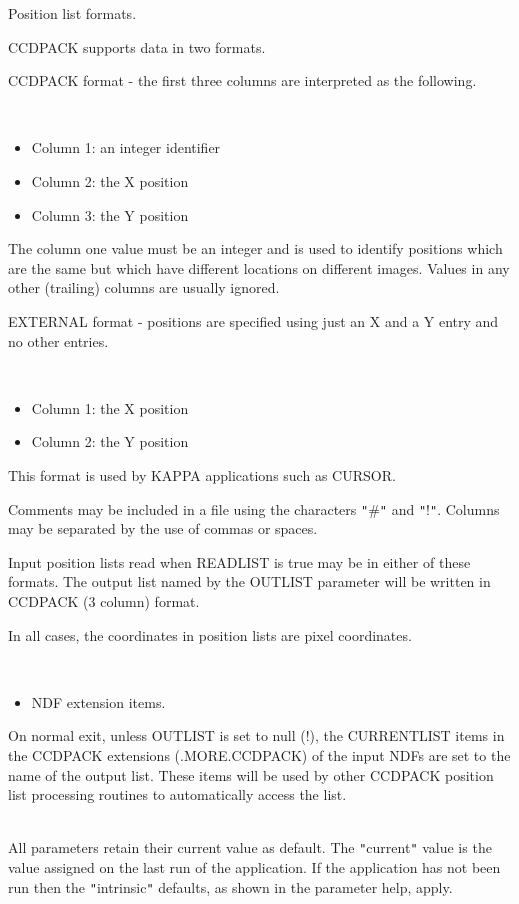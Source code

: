 \documentclass[twoside,11pt]{article}
\newcommand{\xref}[3]{#1}
\renewcommand{\_}{\texttt{\symbol{95}}}
\newcommand{\sstdiytopic}[2]{\item[#1:] \mbox{} \\[1.3ex] #2}
\newcommand{\sstitemlist}[1]{
  \mbox{} \\
  \vspace{-3.5ex}
  \begin{itemize}
     #1
  \end{itemize}
}
\newcommand{\sstitem}{\item}
\newcommand{\sstdiytopic}[2]{\item[{#1:}] #2 }
\newcommand{\sstitemlist}[1]{
      \begin{itemize}
         #1
      \end{itemize}
      \\
   }
\newcommand{\sstitem}{\item}
\begin{document}
{{{         \sstitem
         Position list formats.

      }
        CCDPACK supports data in two formats.

        CCDPACK format - the first three columns are interpreted as the
        following.

      \sstitemlist{

         \sstitem
              Column 1: an integer identifier

         \sstitem
              Column 2: the X position

         \sstitem
              Column 3: the Y position

      }
        The column one value must be an integer and is used to identify
        positions which are the same but which have different locations
        on different images. Values in any other (trailing) columns are
        usually ignored.

        EXTERNAL format - positions are specified using just an X and
        a Y entry and no other entries.

      \sstitemlist{

         \sstitem
              Column 1: the X position

         \sstitem
              Column 2: the Y position

      }
        This format is used by KAPPA applications such as \xref{CURSOR}{sun95}{CURSOR}.

        Comments may be included in a file using the characters {\tt "}\#{\tt "} and
        {\tt "}!{\tt "}. Columns may be separated by the use of commas or spaces.

        Input position lists read when READLIST is true may be in either
        of these formats.  The output list named by the OUTLIST
        parameter will be written in CCDPACK (3 column) format.

        In all cases, the coordinates in position lists are pixel
        coordinates.

      \sstitemlist{

         \sstitem
         NDF extension items.

      }
        On normal exit, unless OUTLIST is set to null (!), the
        CURRENT\_LIST items in the CCDPACK extensions (.MORE.CCDPACK) of
        the input NDFs are set to the name of the output list. These
        items will be used by other CCDPACK position list processing
        routines to automatically access the list.
   }
   \sstdiytopic{
      Behaviour of parameters
   }{
      All parameters retain their current value as default. The
      {\tt "}current{\tt "} value is the value assigned on the last run of the
      application. If the application has not been run then the
      {\tt "}intrinsic{\tt "} defaults, as shown in the parameter help, apply.

}}
\end{document}
